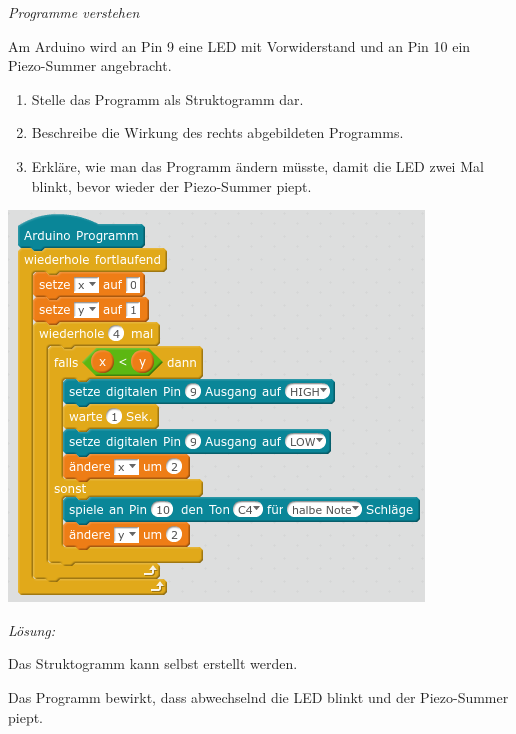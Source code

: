 \documentclass[ngerman, 11pt]{scrreprt}
\begin{document}
	\newpage
	\begin{aufgabe} \emph{Programme verstehen}
		
		\begin{minipage}{0.54\textwidth}
			Am Arduino wird an Pin 9 eine LED mit Vorwiderstand und an Pin 10 ein Piezo-Summer angebracht.
			\begin{enumerate}[label=\alph*),itemsep=0mm, parsep=0mm]
				\item Stelle das Programm als Struktogramm dar.
				\item Beschreibe die Wirkung des rechts abgebildeten Programms.
				\item Erkläre, wie man das Programm ändern müsste, damit die LED zwei Mal blinkt, bevor wieder der Piezo-Summer piept.
			\end{enumerate}
			\vspace{2\baselineskip}
		\end{minipage}
		\hfill
		\begin{minipage}{0.45\textwidth}
			\centering
			\includegraphics[width=\textwidth]{../pics/Uebung-Variablen-und-Schleifen.png}
		\end{minipage}
	\end{aufgabe}
	\bigskip
	
	\emph{Lösung:}
	
	Das Struktogramm kann selbst erstellt werden.
	
	Das Programm bewirkt, dass abwechselnd die LED blinkt und der Piezo-Summer piept.
	
\end{document}
